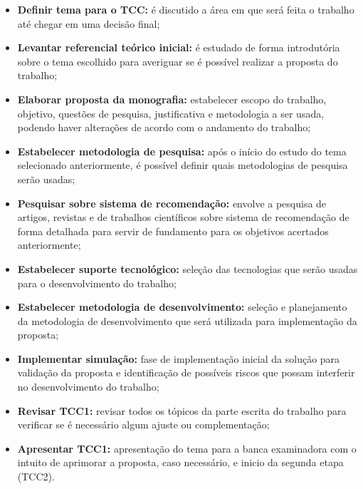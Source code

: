 \begin{itemize}
    \item \textbf{Definir tema para o TCC:} é discutido a área em que será feita o trabalho até chegar em uma decisão final;

    \item \textbf{Levantar referencial teórico inicial:} é estudado de forma introdutória sobre o tema escolhido para averiguar se é possível realizar a proposta do trabalho;

    \item \textbf{Elaborar proposta da monografia:} estabelecer escopo do trabalho, objetivo, questões de pesquisa, justificativa e metodologia a ser usada, podendo haver alterações de acordo com o andamento do trabalho;

    \item \textbf{Estabelecer metodologia de pesquisa:} após o início do estudo do tema selecionado anteriormente, é possível definir quais metodologias de pesquisa serão usadas;

    \item \textbf{Pesquisar sobre sistema de recomendação:} envolve a pesquisa de artigos, revistas e de trabalhos científicos sobre sistema de recomendação de forma detalhada para servir de fundamento para os objetivos acertados anteriormente;

    \item \textbf{Estabelecer suporte tecnológico:} seleção das tecnologias que serão usadas para o desenvolvimento do trabalho;

    \item \textbf{Estabelecer metodologia de desenvolvimento:} seleção e planejamento da metodologia de desenvolvimento que será utilizada para implementação da proposta;

    \item \textbf{Implementar simulação:} fase de implementação inicial da solução para validação da proposta e identificação de possíveis riscos que possam interferir no desenvolvimento do trabalho;

    \item \textbf{Revisar TCC1:} revisar todos os tópicos da parte escrita do trabalho para verificar se é necessário algum ajuste ou complementação;

    \item \textbf{Apresentar TCC1:} apresentação do tema para a banca examinadora com o intuito de aprimorar a proposta, caso necessário, e inicio da segunda etapa (TCC2).

\end{itemize}

